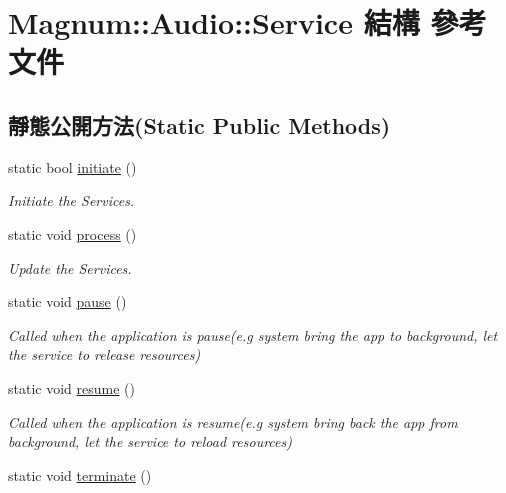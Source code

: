 \hypertarget{struct_magnum_1_1_audio_1_1_service}{}\section{Magnum\+:\+:Audio\+:\+:Service 結構 參考文件}
\label{struct_magnum_1_1_audio_1_1_service}
\subsection*{靜態公開方法(Static Public Methods)}
\begin{DoxyCompactItemize}
\item 
static bool \hyperlink{struct_magnum_1_1_audio_1_1_service_a6ce71d0150696798d7b888c69658e926}{initiate} ()
\begin{DoxyCompactList}\small\item\em Initiate the Services. \end{DoxyCompactList}\item 
static void \hyperlink{struct_magnum_1_1_audio_1_1_service_a7e5b7e49e62d6efe5e09526ae0df3050}{process} ()\hypertarget{struct_magnum_1_1_audio_1_1_service_a7e5b7e49e62d6efe5e09526ae0df3050}{}\label{struct_magnum_1_1_audio_1_1_service_a7e5b7e49e62d6efe5e09526ae0df3050}

\begin{DoxyCompactList}\small\item\em Update the Services. \end{DoxyCompactList}\item 
static void \hyperlink{struct_magnum_1_1_audio_1_1_service_a24e8ff3eac10eb7e3a59f6d2820f8b6a}{pause} ()\hypertarget{struct_magnum_1_1_audio_1_1_service_a24e8ff3eac10eb7e3a59f6d2820f8b6a}{}\label{struct_magnum_1_1_audio_1_1_service_a24e8ff3eac10eb7e3a59f6d2820f8b6a}

\begin{DoxyCompactList}\small\item\em Called when the application is pause(e.\+g system bring the app to background, let the service to release resources) \end{DoxyCompactList}\item 
static void \hyperlink{struct_magnum_1_1_audio_1_1_service_a04dc8b589057ee292ebc57b5d488b3aa}{resume} ()\hypertarget{struct_magnum_1_1_audio_1_1_service_a04dc8b589057ee292ebc57b5d488b3aa}{}\label{struct_magnum_1_1_audio_1_1_service_a04dc8b589057ee292ebc57b5d488b3aa}

\begin{DoxyCompactList}\small\item\em Called when the application is resume(e.\+g system bring back the app from background, let the service to reload resources) \end{DoxyCompactList}\item 
static void \hyperlink{struct_magnum_1_1_audio_1_1_service_ae4a7ea2116f1c0d744a5c316d8ffba48}{terminate} ()\hypertarget{struct_magnum_1_1_audio_1_1_service_ae4a7ea2116f1c0d744a5c316d8ffba48}{}\label{struct_magnum_1_1_audio_1_1_service_ae4a7ea2116f1c0d744a5c316d8ffba48}


\end{DoxyCompactItemize}
